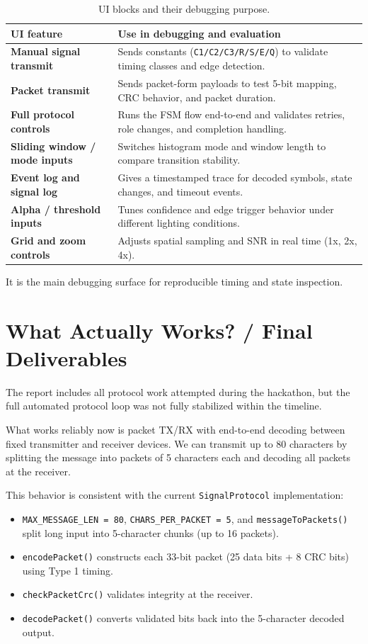 \documentclass[10pt,a4paper]{article}
\begin{document}
\begin{table}[H]
\centering
\caption{UI blocks and their debugging purpose.}
\begin{tabularx}{\linewidth}{>{\bfseries}l X}
\toprule
UI feature & Use in debugging and evaluation \\
\midrule
Manual signal transmit & Sends constants (\texttt{C1/C2/C3/R/S/E/Q}) to validate timing classes and edge detection. \\
Packet transmit & Sends packet-form payloads to test 5-bit mapping, CRC behavior, and packet duration. \\
Full protocol controls & Runs the FSM flow end-to-end and validates retries, role changes, and completion handling. \\
Sliding window / mode inputs & Switches histogram mode and window length to compare transition stability. \\
Event log and signal log & Gives a timestamped trace for decoded symbols, state changes, and timeout events. \\
Alpha / threshold inputs & Tunes confidence and edge trigger behavior under different lighting conditions. \\
Grid and zoom controls & Adjusts spatial sampling and SNR in real time (1x, 2x, 4x). \\
\bottomrule
\end{tabularx}
\end{table}

It is the main debugging surface for reproducible timing and state inspection.

\section{What Actually Works? / Final Deliverables}
The report includes all protocol work attempted during the hackathon, but the full automated protocol loop was not fully stabilized within the timeline.

What works reliably now is packet TX/RX with end-to-end decoding between fixed transmitter and receiver devices. We can transmit up to 80 characters by splitting the message into packets of 5 characters each and decoding all packets at the receiver.

This behavior is consistent with the current \texttt{SignalProtocol} implementation:
\begin{itemize}
\item \texttt{MAX\_MESSAGE\_LEN = 80}, \texttt{CHARS\_PER\_PACKET = 5}, and \texttt{messageToPackets()} split long input into 5-character chunks (up to 16 packets).
\item \texttt{encodePacket()} constructs each 33-bit packet (25 data bits + 8 CRC bits) using Type 1 timing.
\item \texttt{checkPacketCrc()} validates integrity at the receiver.
\item \texttt{decodePacket()} converts validated bits back into the 5-character decoded output.
\end{itemize}
\end{document}
